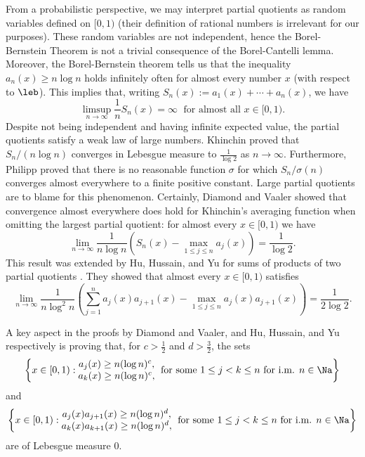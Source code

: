 \documentclass[12pt,a4paper]{amsart}
\begin{document}
From a probabilistic perspective, we may interpret partial quotients as random variables defined on $[0,1)$ (their definition of rational numbers is irrelevant for our purposes). These random variables are not independent, hence the Borel-Bernstein Theorem is not a trivial consequence of the Borel-Cantelli lemma. Moreover, the Borel-Bernstein theorem tells us that the inequality $a_n(x)\geq n\log n$ holds infinitely often for almost every number $x$ (with respect to $\leb$). This implies that, writing $S_n(x):=a_1(x) + \cdots + a_n(x)$, we have
\[
\limsup_{n\to\infty} \frac{1}{n} S_n(x) = \infty
\;\text{ for almost all } x\in [0,1).
\]
Despite not being independent and having infinite expected value, the partial quotients satisfy a weak law of large numbers. Khinchin \cite[\S. 4]{Khintchine1935} proved that $S_n/(n\log n)$ converges in Lebesgue measure to $\frac{1}{\log 2}$ as $n\to\infty$. Furthermore, Philipp \cite[Theorem 1]{Philipp1988} proved that there is no reasonable function $\sigma$ for which $S_n/\sigma(n)$ converges almost everywhere to a finite positive constant. Large partial quotients are to blame for this phenomenon. Certainly, Diamond and Vaaler \cite[Corollary 1]{DiamondVaaler1986} showed that convergence almost everywhere does hold for Khinchin's averaging function when omitting the largest partial quotient: for almost every $x\in [0,1)$ we have
\begin{equation}\label{Eq:Thm:DV}
\lim_{n\to\infty} 
\frac{1}{n\log n}\left( S_n(x) - \max_{1\leq j \leq n} a_j(x)\right)
=
\frac{1}{\log 2}.
\end{equation}
This result was extended by Hu, Hussain, and Yu for sums of products of two partial quotients \cite[Theorem 1.5]{HuHussainYu2021}. They showed that almost every $x\in [0,1)$ satisfies
\begin{equation}\label{Eq:Thm:HHY}
\lim_{n\to\infty} 
\frac{1}{n\log^2 n}\left( \sum_{j=1}^n a_j(x)a_{j+1}(x) - \max_{1\leq j \leq n} a_j(x)a_{j+1}(x)\right)
=
\frac{1}{2\log 2}.
\end{equation}

A key aspect in the proofs by Diamond and Vaaler, and Hu, Hussain, and Yu respectively is proving that, for $c>\frac{1}{2}$ and $d>\frac{3}{2}$, the sets
\[
\left\{
x\in [0,1):
\begin{matrix}
a_j(x) \geq  n (\log n)^{c}, \\
a_k(x) \geq  n (\log n)^{c},
\end{matrix}\;
\text{ for some } 1\leq j < k \leq n \text{ for i.m.   } n\in\Na
\right\}
\]
and
\[
\left\{x\in [0,1): 
\begin{matrix}
a_j(x)a_{j+1}(x) \geq n (\log n)^{d} , \\
a_k(x)a_{k+1}(x) \geq n (\log n)^{d},  \\
\end{matrix}\;
\text{ for some } 1\leq j < k \leq n \text{ for i.m.   } n\in\Na\right\}
\]
are of Lebesgue measure $0$.
\end{document}
